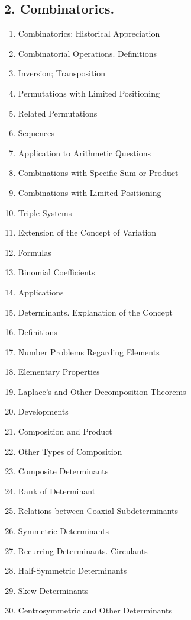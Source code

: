 \subsection*{\small 2. Combinatorics. }

\begin{enumerate}[itemsep=0pt]
    \item Combinatorics; Historical Appreciation
    \item Combinatorial Operations. Definitions
    \item Inversion; Transposition
    \item Permutations with Limited Positioning
    \item Related Permutations
    \item Sequences
    \item Application to Arithmetic Questions
    \item Combinations with Specific Sum or Product
    \item Combinations with Limited Positioning
    \item Triple Systems
    \item Extension of the Concept of Variation
    \item Formulas
    \item Binomial Coefficients
    \item Applications
    \item Determinants. Explanation of the Concept
    \item Definitions
    \item Number Problems Regarding Elements
    \item Elementary Properties
    \item Laplace's and Other Decomposition Theorems
    \item Developments
    \item Composition and Product
    \item Other Types of Composition
    \item Composite Determinants
    \item Rank of Determinant
    \item Relations between Coaxial Subdeterminants
    \item Symmetric Determinants
    \item Recurring Determinants. Circulants
    \item Half-Symmetric Determinants
    \item Skew Determinants
    \item Centrosymmetric and Other Determinants
\end{enumerate}
